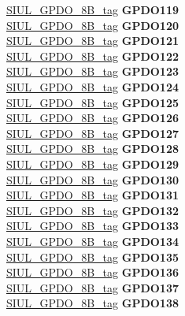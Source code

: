 \begin{DoxyCompactItemize}
\begin{tabbing}
\>\>\mbox{\hyperlink{unionSIUL__GPDO__8B__tag}{SIUL\_GPDO\_8B\_tag}} {\bfseries GPDO119}\\
\>\>\mbox{\hyperlink{unionSIUL__GPDO__8B__tag}{SIUL\_GPDO\_8B\_tag}} {\bfseries GPDO120}\\
\>\>\mbox{\hyperlink{unionSIUL__GPDO__8B__tag}{SIUL\_GPDO\_8B\_tag}} {\bfseries GPDO121}\\
\>\>\mbox{\hyperlink{unionSIUL__GPDO__8B__tag}{SIUL\_GPDO\_8B\_tag}} {\bfseries GPDO122}\\
\>\>\mbox{\hyperlink{unionSIUL__GPDO__8B__tag}{SIUL\_GPDO\_8B\_tag}} {\bfseries GPDO123}\\
\>\>\mbox{\hyperlink{unionSIUL__GPDO__8B__tag}{SIUL\_GPDO\_8B\_tag}} {\bfseries GPDO124}\\
\>\>\mbox{\hyperlink{unionSIUL__GPDO__8B__tag}{SIUL\_GPDO\_8B\_tag}} {\bfseries GPDO125}\\
\>\>\mbox{\hyperlink{unionSIUL__GPDO__8B__tag}{SIUL\_GPDO\_8B\_tag}} {\bfseries GPDO126}\\
\>\>\mbox{\hyperlink{unionSIUL__GPDO__8B__tag}{SIUL\_GPDO\_8B\_tag}} {\bfseries GPDO127}\\
\>\>\mbox{\hyperlink{unionSIUL__GPDO__8B__tag}{SIUL\_GPDO\_8B\_tag}} {\bfseries GPDO128}\\
\>\>\mbox{\hyperlink{unionSIUL__GPDO__8B__tag}{SIUL\_GPDO\_8B\_tag}} {\bfseries GPDO129}\\
\>\>\mbox{\hyperlink{unionSIUL__GPDO__8B__tag}{SIUL\_GPDO\_8B\_tag}} {\bfseries GPDO130}\\
\>\>\mbox{\hyperlink{unionSIUL__GPDO__8B__tag}{SIUL\_GPDO\_8B\_tag}} {\bfseries GPDO131}\\
\>\>\mbox{\hyperlink{unionSIUL__GPDO__8B__tag}{SIUL\_GPDO\_8B\_tag}} {\bfseries GPDO132}\\
\>\>\mbox{\hyperlink{unionSIUL__GPDO__8B__tag}{SIUL\_GPDO\_8B\_tag}} {\bfseries GPDO133}\\
\>\>\mbox{\hyperlink{unionSIUL__GPDO__8B__tag}{SIUL\_GPDO\_8B\_tag}} {\bfseries GPDO134}\\
\>\>\mbox{\hyperlink{unionSIUL__GPDO__8B__tag}{SIUL\_GPDO\_8B\_tag}} {\bfseries GPDO135}\\
\>\>\mbox{\hyperlink{unionSIUL__GPDO__8B__tag}{SIUL\_GPDO\_8B\_tag}} {\bfseries GPDO136}\\
\>\>\mbox{\hyperlink{unionSIUL__GPDO__8B__tag}{SIUL\_GPDO\_8B\_tag}} {\bfseries GPDO137}\\
\>\>\mbox{\hyperlink{unionSIUL__GPDO__8B__tag}{SIUL\_GPDO\_8B\_tag}} {\bfseries GPDO138}\\

\end{tabbing}
\end{DoxyCompactItemize}
